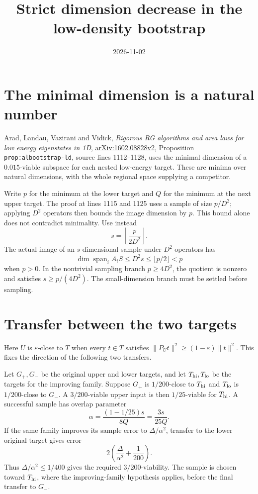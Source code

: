 \documentclass{article}
\title{Strict dimension decrease in the low-density bootstrap}
\author{}
\date{2026-11-02}
\begin{document}
\maketitle
{}

\section{The minimal dimension is a natural number}

Arad, Landau, Vazirani and Vidick,
\emph{Rigorous RG algorithms and area laws for low energy eigenstates in 1D},
\href{https://arxiv.org/abs/1602.08828}{arXiv:1602.08828v2},
Proposition \texttt{prop:albootstrap-ld}, source lines 1112--1128,
uses the minimal dimension of a $0.015$-viable subspace for each nested
low-energy target. These are minima over natural dimensions, with the
whole regional space supplying a competitor.

Write $p$ for the minimum at the lower target and $Q$ for the minimum
at the next upper target. The proof at lines 1115 and 1125 uses a sample
of size $p/D^2$; applying $D^2$ operators then bounds the image dimension
by $p$. This bound alone does not contradict minimality.
Use instead
\[
    s=\left\lfloor\frac{p}{2D^2}\right\rfloor.
\]
The actual image of an $s$-dimensional sample under $D^2$ operators has
\[
    \dim\operatorname{span}_i A_iS\le D^2s\le\lfloor p/2\rfloor<p
\]
when $p>0$. In the nontrivial sampling branch $p\ge4D^2$, the quotient
is nonzero and satisfies $s\ge p/(4D^2)$. The small-dimension branch
must be settled before sampling.

\section{Transfer between the two targets}

Here $U$ is $\varepsilon$-close to $T$ when every $t\in T$ satisfies
$\|P_Ut\|^2\ge(1-\varepsilon)\|t\|^2$. This fixes the direction of the
following two transfers.

Let $G_+,G_-$ be the original upper and lower targets, and let
$T_{\rm hi},T_{\rm lo}$ be the targets for the improving family.
Suppose $G_+$ is $1/200$-close to $T_{\rm hi}$ and $T_{\rm lo}$ is
$1/200$-close to $G_-$. A $3/200$-viable upper input is then
$1/25$-viable for $T_{\rm hi}$. A successful sample has overlap parameter
\[
    \alpha=\frac{(1-1/25)s}{8Q}=\frac{3s}{25Q}.
\]
If the same family improves its sample error to $\Delta/\alpha^2$,
transfer to the lower original target gives error
\[
    2\left(\frac{\Delta}{\alpha^2}+\frac1{200}\right).
\]
Thus $\Delta/\alpha^2\le1/400$ gives the required $3/200$-viability.
The sample is chosen toward $T_{\rm hi}$, where the improving-family
hypothesis applies, before the final transfer to $G_-$.
\end{document}
